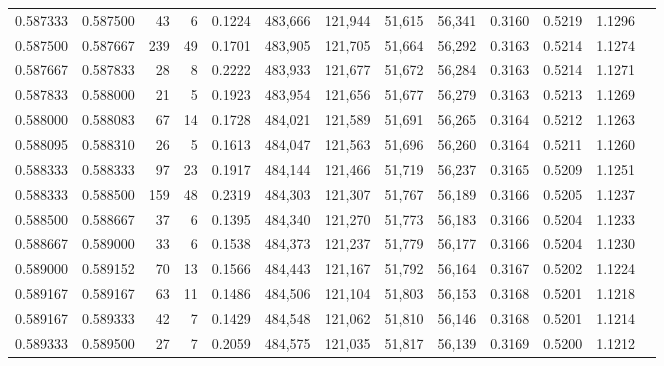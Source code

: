 \begin{tabular}{rrrrrrrrrrrrr}
0.587333 & 0.587500 &    43 &   6 &                                     0.1224 & 483,666 & 121,944 &  51,615 &  56,341 & 0.3160 & 0.5219 & 1.1296 \\
0.587500 & 0.587667 &   239 &  49 &                                     0.1701 & 483,905 & 121,705 &  51,664 &  56,292 & 0.3163 & 0.5214 & 1.1274 \\
0.587667 & 0.587833 &    28 &   8 &                                     0.2222 & 483,933 & 121,677 &  51,672 &  56,284 & 0.3163 & 0.5214 & 1.1271 \\
0.587833 & 0.588000 &    21 &   5 &                                     0.1923 & 483,954 & 121,656 &  51,677 &  56,279 & 0.3163 & 0.5213 & 1.1269 \\
0.588000 & 0.588083 &    67 &  14 &                                     0.1728 & 484,021 & 121,589 &  51,691 &  56,265 & 0.3164 & 0.5212 & 1.1263 \\
0.588095 & 0.588310 &    26 &   5 &                                     0.1613 & 484,047 & 121,563 &  51,696 &  56,260 & 0.3164 & 0.5211 & 1.1260 \\
0.588333 & 0.588333 &    97 &  23 &                                     0.1917 & 484,144 & 121,466 &  51,719 &  56,237 & 0.3165 & 0.5209 & 1.1251 \\
0.588333 & 0.588500 &   159 &  48 &                                     0.2319 & 484,303 & 121,307 &  51,767 &  56,189 & 0.3166 & 0.5205 & 1.1237 \\
0.588500 & 0.588667 &    37 &   6 &                                     0.1395 & 484,340 & 121,270 &  51,773 &  56,183 & 0.3166 & 0.5204 & 1.1233 \\
0.588667 & 0.589000 &    33 &   6 &                                     0.1538 & 484,373 & 121,237 &  51,779 &  56,177 & 0.3166 & 0.5204 & 1.1230 \\
0.589000 & 0.589152 &    70 &  13 &                                     0.1566 & 484,443 & 121,167 &  51,792 &  56,164 & 0.3167 & 0.5202 & 1.1224 \\
0.589167 & 0.589167 &    63 &  11 &                                     0.1486 & 484,506 & 121,104 &  51,803 &  56,153 & 0.3168 & 0.5201 & 1.1218 \\
0.589167 & 0.589333 &    42 &   7 &                                     0.1429 & 484,548 & 121,062 &  51,810 &  56,146 & 0.3168 & 0.5201 & 1.1214 \\
0.589333 & 0.589500 &    27 &   7 &                                     0.2059 & 484,575 & 121,035 &  51,817 &  56,139 & 0.3169 & 0.5200 & 1.1212 \\

\end{tabular}
